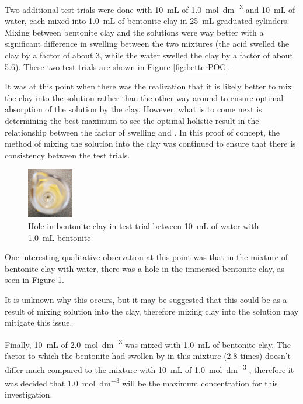 \documentclass[11pt, letterpaper]{article}
\begin{document}
Two additional test trials were done with \SI{10}{mL} of
\SI{1.0}{mol.dm^{-3}}  and \SI{10}{mL} of water,
each mixed into \SI{1.0}{mL} of bentonite clay in
\SI{25}{mL} graduated cylinders. Mixing between
bentonite clay and the solutions were way better with a
significant difference in swelling between the two mixtures
(the acid swelled the clay by a factor of about 3, while
the water swelled the clay by a factor of about 5.6).
These two test trials are shown in Figure \ref*{fig:betterPOC}.

It was at this point when there was the realization that it
is likely better to mix the clay into the solution rather than
the other way around to ensure optimal absorption of the solution
by the clay. However, what is to come next is determining the
best maximum \ce{[H+]} to see the optimal holistic result
in the relationship between the factor of swelling and \ce{[H+]}.
In this proof of concept, the method of mixing the solution
into the clay was continued to ensure that there is consistency
between the test trials.

\begin{figure}
    \begin{center}
        \includegraphics[width=0.18\textwidth]{hole.jpg}
    \end{center}
    \caption{Hole in bentonite clay in test trial between \SI{10}{mL} of water with \SI{1.0}{mL} bentonite}
    \label{fig:hole}
\end{figure}

One interesting qualitative observation at this point was that
in the mixture of bentonite clay with water, there was a hole
in the immersed bentonite clay, as seen in Figure \ref*{fig:hole}.

It is unknown why this occurs, but it may be suggested that
this could be as a result of mixing solution into the clay,
therefore mixing clay into the solution may mitigate this issue.

Finally, \SI{10}{mL} of \SI{2.0}{mol.dm^{-3}} was mixed with \SI{1.0}{mL}
of bentonite clay. The factor to which the bentonite had swollen by
in this mixture (2.8 times) doesn't differ much compared to the
mixture with \SI{10}{mL} of \SI{1.0}{mol.dm^{-3}} , therefore
it was decided that \SI{1.0}{mol.dm^{-3}} will be the maximum
concentration for this investigation.
\end{document}
